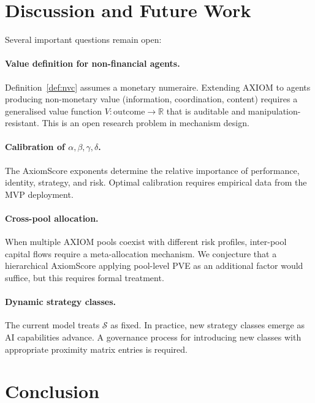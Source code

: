 \documentclass[11pt,a4paper]{article}
\theoremstyle{plain}
\theoremstyle{definition}
\theoremstyle{remark}
\newcommand{\R}{\mathbb{R}}
\begin{document}
\section{Discussion and Future Work}

Several important questions remain open:

\paragraph{Value definition for non-financial agents.}
Definition~\ref{def:nvc} assumes a monetary numeraire. Extending AXIOM to
agents producing non-monetary value (information, coordination, content) requires
a generalised value function $V : \text{outcome} \to \R$ that is
auditable and manipulation-resistant. This is an open research problem
in mechanism design.

\paragraph{Calibration of $\alpha, \beta, \gamma, \delta$.}
The AxiomScore exponents determine the relative importance of performance,
identity, strategy, and risk. Optimal calibration requires empirical data
from the MVP deployment.

\paragraph{Cross-pool allocation.}
When multiple AXIOM pools coexist with different risk profiles, inter-pool
capital flows require a meta-allocation mechanism. We conjecture that a
hierarchical AxiomScore applying pool-level PVE as an additional factor
would suffice, but this requires formal treatment.

\paragraph{Dynamic strategy classes.}
The current model treats $\mathcal{S}$ as fixed. In practice, new strategy
classes emerge as AI capabilities advance. A governance process for introducing
new classes with appropriate proximity matrix entries is required.

\section{Conclusion}
\end{document}
